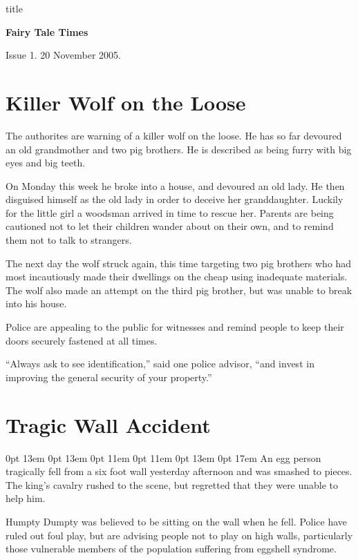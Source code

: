 \documentclass{article}
\begin{document}
\begin{staticcontents*}{title}
\begin{center}
\bfseries\Huge
Fairy Tale Times
\end{center}
\hfill Issue 1. 20 November 2005.
\end{staticcontents*}

\section{Killer Wolf on the Loose}

The authorites are warning of a killer wolf on the
loose. He has so far devoured an old grandmother and
two pig brothers. He is described as being furry with
big eyes and big teeth.

On Monday this week he broke into a house, and devoured
an old lady. He then disguised himself as the old lady
in order to deceive her granddaughter. Luckily for the little
girl a woodsman arrived in time to rescue her. Parents are
being cautioned not to let their children wander about on
their own, and to remind them not to talk to strangers.\par
\framebreak

The next day the wolf struck again, this time targeting two
pig brothers who had most incautiously made their dwellings
on the cheap using inadequate materials. The wolf also made
an attempt on the third pig brother, but was unable to break
into his house.

Police are appealing to the public for witnesses and remind
people to keep their doors securely fastened at all times.

``Always ask to see identification,'' said one police advisor,
``and invest in improving the general security of your property.''

\framebreak
\section{Tragic Wall Accident}

{ 0pt 13em 0pt 13em 0pt 11em 0pt 11em 0pt 13em
0pt 17em
An egg person tragically fell from a six foot wall yesterday 
afternoon and was smash\-ed to pieces. The king's cavalry rushed
to the scene, but regretted that they  were unable to help him.
\par}

Humpty Dumpty was believed to be sitting
on the wall when he fell. Police have ruled out foul play, but
are advising people not to play on high walls, particularly
those vulnerable members of the population suffering from
eggshell syndrome.
\end{document}
